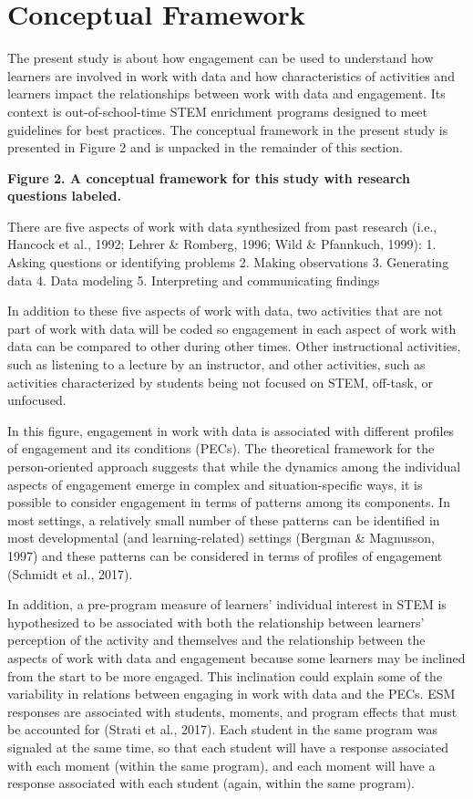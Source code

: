 \documentclass[]{book}
\theoremstyle{definition}
\theoremstyle{definition}
\theoremstyle{definition}
\theoremstyle{remark}
\begin{document}
\section{Conceptual Framework}\label{conceptual-framework}

The present study is about how engagement can be used to understand how
learners are involved in work with data and how characteristics of
activities and learners impact the relationships between work with data
and engagement. Its context is out-of-school-time STEM enrichment
programs designed to meet guidelines for best practices. The conceptual
framework in the present study is presented in Figure 2 and is unpacked
in the remainder of this section.

\textbf{Figure 2. A conceptual framework for this study with research
questions labeled.}

There are five aspects of work with data synthesized from past research
(i.e., Hancock et al., 1992; Lehrer \& Romberg, 1996; Wild \& Pfannkuch,
1999): 1. Asking questions or identifying problems 2. Making
observations 3. Generating data 4. Data modeling 5. Interpreting and
communicating findings

In addition to these five aspects of work with data, two activities that
are not part of work with data will be coded so engagement in each
aspect of work with data can be compared to other during other times.
Other instructional activities, such as listening to a lecture by an
instructor, and other activities, such as activities characterized by
students being not focused on STEM, off-task, or unfocused.

In this figure, engagement in work with data is associated with
different profiles of engagement and its conditions (PECs). The
theoretical framework for the person-oriented approach suggests that
while the dynamics among the individual aspects of engagement emerge in
complex and situation-specific ways, it is possible to consider
engagement in terms of patterns among its components. In most settings,
a relatively small number of these patterns can be identified in most
developmental (and learning-related) settings (Bergman \& Magnusson,
1997) and these patterns can be considered in terms of profiles of
engagement (Schmidt et al., 2017).

In addition, a pre-program measure of learners' individual interest in
STEM is hypothesized to be associated with both the relationship between
learners' perception of the activity and themselves and the relationship
between the aspects of work with data and engagement because some
learners may be inclined from the start to be more engaged. This
inclination could explain some of the variability in relations between
engaging in work with data and the PECs. ESM responses are associated
with students, moments, and program effects that must be accounted for
(Strati et al., 2017). Each student in the same program was signaled at
the same time, so that each student will have a response associated with
each moment (within the same program), and each moment will have a
response associated with each student (again, within the same program).
\end{document}
